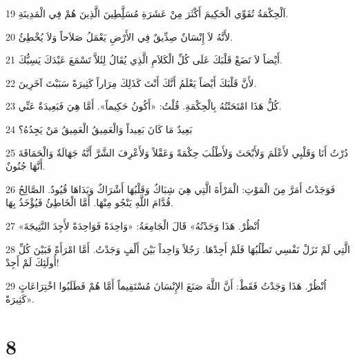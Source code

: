\par 19 اَلْحِكْمَةُ تُقَوِّي الْحَكِيمَ أَكْثَرَ مِنْ عَشَرَةِ مُسَلَِّطِينَ الَّذِينَ هُمْ فِي الْمَدِينَةِ.
\par 20 لأَنَّهُ لاَ إِنْسَانٌ صِدِّيقٌ فِي الأَرْضِ يَعْمَلُ صَلاَحاً وَلاَ يُخْطِئُ.
\par 21 أَيْضاً لاَ تَضَعْ قَلْبَكَ عَلَى كُلِّ الْكَلاَمِ الَّذِي يُقَالُ لِئَلاَّ تَسْمَعَ عَبْدَكَ يَسِبُّكَ.
\par 22 لأَنَّ قَلْبَكَ أَيْضاً يَعْلَمُ أَنَّكَ أَنْتَ كَذَلِكَ مِرَاراً كَثِيرَةً سَبَبْتَ آخَرِينَ.
\par 23 كُلُّ هَذَا امْتَحَنْتُهُ بِالْحِكْمَةِ. قُلْتُ: «أَكُونُ حَكِيماً». أَمَّا هِيَ فَبَعِيدَةٌ عَنِّي.
\par 24 بَعِيدٌ مَا كَانَ بَعِيداً وَالْعَمِيقُ الْعَمِيقُ مَنْ يَجِدُهُ؟
\par 25 دُرْتُ أَنَا وَقَلْبِي لأَعْلَمَ وَلأَبْحَثَ وَلأَطْلُبَ حِكْمَةً وَعَقْلاً وَلأَعْرِفَ الشَّرَّ أَنَّهُ جَهَالَةٌ وَالْحَمَاقَةَ أَنَّهَا جُنُونٌ.
\par 26 فَوَجَدْتُ أَمَرَّ مِنَ الْمَوْتِ: الْمَرْأَةَ الَّتِي هِيَ شِبَاكٌ وَقَلْبُهَا أَشْرَاكٌ وَيَدَاهَا قُيُودٌ. الصَّالِحُ قُدَّامَ اللَّهِ يَنْجُو مِنْهَا. أَمَّا الْخَاطِئُ فَيُؤْخَذُ بِهَا.
\par 27 «اُنْظُرْ. هَذَا وَجَدْتُهُ» قَالَ الْجَامِعَةُ: «وَاحِدَةً فَوَاحِدَةً لأَجِدَ النَّتِيجَةَ
\par 28 الَّتِي لَمْ تَزَلْ نَفْسِي تَطْلُبُهَا فَلَمْ أَجِدْهَا. رَجُلاً وَاحِداً بَيْنَ أَلْفٍ وَجَدْتُ. أَمَّا امْرَأَةً فَبَيْنَ كُلِّ أُولَئِكَ لَمْ أَجِدْ!
\par 29 اُنْظُرْ. هَذَا وَجَدْتُ فَقَطْ: أَنَّ اللَّهَ صَنَعَ الإِنْسَانَ مُسْتَقِيماً أَمَّا هُمْ فَطَلَبُوا اخْتِرَاعَاتٍ كَثِيرَةً».

\chapter{8}

